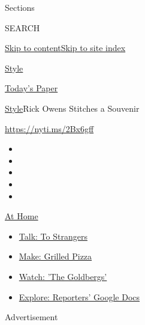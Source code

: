 Sections

SEARCH

\protect\hyperlink{site-content}{Skip to
content}\protect\hyperlink{site-index}{Skip to site index}

\href{https://www.nytimes3xbfgragh.onion/section/style}{Style}

\href{https://myaccount.nytimes3xbfgragh.onion/auth/login?response_type=cookie\&client_id=vi}{}

\href{https://www.nytimes3xbfgragh.onion/section/todayspaper}{Today's
Paper}

\href{/section/style}{Style}\textbar{}Rick Owens Stitches a Souvenir

\url{https://nyti.ms/2Bx6gff}

\begin{itemize}
\item
\item
\item
\item
\item
\end{itemize}

\href{https://www.nytimes3xbfgragh.onion/spotlight/at-home?action=click\&pgtype=Article\&state=default\&region=TOP_BANNER\&context=at_home_menu}{At
Home}

\begin{itemize}
\tightlist
\item
  \href{https://www.nytimes3xbfgragh.onion/2020/08/03/well/family/the-benefits-of-talking-to-strangers.html?action=click\&pgtype=Article\&state=default\&region=TOP_BANNER\&context=at_home_menu}{Talk:
  To Strangers}
\item
  \href{https://www.nytimes3xbfgragh.onion/2020/08/01/at-home/coronavirus-make-pizza-on-a-grill.html?action=click\&pgtype=Article\&state=default\&region=TOP_BANNER\&context=at_home_menu}{Make:
  Grilled Pizza}
\item
  \href{https://www.nytimes3xbfgragh.onion/2020/07/31/arts/television/goldbergs-abc-stream.html?action=click\&pgtype=Article\&state=default\&region=TOP_BANNER\&context=at_home_menu}{Watch:
  'The Goldbergs'}
\item
  \href{https://www.nytimes3xbfgragh.onion/interactive/2020/at-home/even-more-reporters-editors-diaries-lists-recommendations.html?action=click\&pgtype=Article\&state=default\&region=TOP_BANNER\&context=at_home_menu}{Explore:
  Reporters' Google Docs}
\end{itemize}

Advertisement

